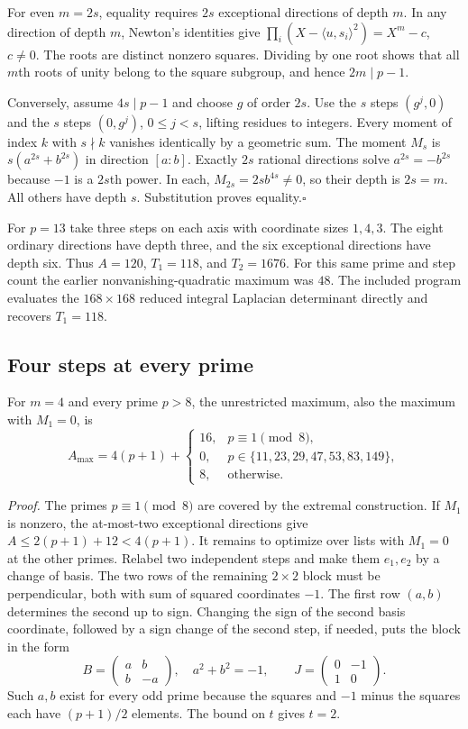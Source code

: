 For even $m=2s$, equality requires $2s$ exceptional directions of depth $m$. In any direction of depth $m$, Newton's identities give $\prod_i (X-\langle u,s_i\rangle^2)=X^m-c$, $c\ne0$. The roots are distinct nonzero squares. Dividing by one root shows that all $m$th roots of unity belong to the square subgroup, and hence $2m\mid p-1$.

Conversely, assume $4s\mid p-1$ and choose $g$ of order $2s$. Use the $s$ steps $(g^j,0)$ and the $s$ steps $(0,g^j)$, $0\le j<s$, lifting residues to integers. Every moment of index $k$ with $s\nmid k$ vanishes identically by a geometric sum. The moment $M_s$ is $s(a^{2s}+b^{2s})$ in direction $[a:b]$. Exactly $2s$ rational directions solve $a^{2s}=-b^{2s}$ because $-1$ is a $2s$th power. In each, $M_{2s}=2s b^{4s}\ne0$, so their depth is $2s=m$. All others have depth $s$. Substitution proves equality.\hfill$\square$

For $p=13$ take three steps on each axis with coordinate sizes $1,4,3$. The eight ordinary directions have depth three, and the six exceptional directions have depth six. Thus $A=120$, $T_1=118$, and $T_2=1676$. For this same prime and step count the earlier nonvanishing-quadratic maximum was $48$. The included program evaluates the $168\times168$ reduced integral Laplacian determinant directly and recovers $T_1=118$.

\subsection{Four steps at every prime}
For $m=4$ and every prime $p>8$, the unrestricted maximum, also the maximum with $M_1=0$, is
\begin{equation}
 A_{\max}=4(p+1)+
 \begin{cases}
  16,&p\equiv1\pmod8,\\
  0,&p\in\{11,23,29,47,53,83,149\},\\
  8,&\text{otherwise}.
 \end{cases}                                                    \label{eq:graph-four}
\end{equation}

\emph{Proof.} The primes $p\equiv1\pmod8$ are covered by the extremal construction. If $M_1$ is nonzero, the at-most-two exceptional directions give $A\le2(p+1)+12<4(p+1)$. It remains to optimize over lists with $M_1=0$ at the other primes. Relabel two independent steps and make them $e_1,e_2$ by a change of basis. The two rows of the remaining $2\times2$ block must be perpendicular, both with sum of squared coordinates $-1$. The first row $(a,b)$ determines the second up to sign. Changing the sign of the second basis coordinate, followed by a sign change of the second step, if needed, puts the block in the form
\[
 B=\begin{pmatrix}a&b\\b&-a\end{pmatrix},\quad a^2+b^2=-1,
 \qquad J=\begin{pmatrix}0&-1\\1&0\end{pmatrix}.
\]
Such $a,b$ exist for every odd prime because the squares and $-1$ minus the squares each have $(p+1)/2$ elements. The bound on $t$ gives $t=2$.

